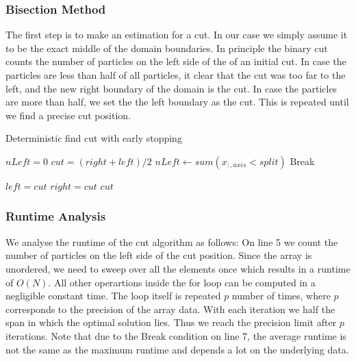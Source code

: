 \documentclass[]{article}
\begin{document}
\subsubsection{Bisection Method}

The first step is to make an estimation for a cut. In our case we simply assume it to be the exact middle of the domain boundaries. In principle the binary cut counts the number of particles on the left side of the of an initial cut. In case the particles are less than half of all particles, it clear that the cut was too far to the left, and the new right boundary of the domain is the cut. In case the particles are more than half, we set the the left boundary as the cut. This is repeated until we find a precise cut position.


\begin{algorithm}[H]
	\caption{Deterministic find cut with early stopping}\label{algo:cut}
	\begin{algorithmic}[1]
		\State $nLeft = 0$
		\newline
		\State $cut = (right + left ) / 2 $
		\State $nLeft\gets sum(x_{:,axis} < split)$
		\newline
		\State Break
		\EndIf
		\newline
		
		\State $left = cut$
		\Else 
		\State $right = cut$
		\EndIf
		\newline
		\EndFor
		\State \Return $cut$
		\EndProcedure
	\end{algorithmic}
\end{algorithm}

\subsubsection{Runtime Analysis}

We analyse the runtime of the cut algorithm as follows: On line 5 we count the number of particles on the left side of the cut position. Since the array is unordered, we need to sweep over all the elements once which results in a runtime of $O(N)$. All other operartions inside the for loop can be computed in a negligible constant time. The loop itself is repeated $p$ number of times, where $p$ corresponds to the precision of the array data. With each iteration we half the span in which the optimal solution lies. Thus we reach the precision limit after $p$ iterations. Note that due to the Break condition on line 7, the average runtime is not the same as the maximum runtime and depends a lot on the underlying data.
\end{document}
